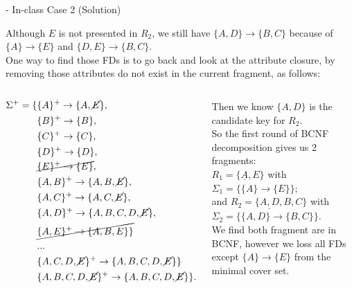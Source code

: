 \begin{frame}[fragile]{ - In-class Case 2 (Solution)}
	
	Although $E$ is not presented in $R_2$, we still have $\{A,D\}\rightarrow\{B,C\}$ because of $\{A\}\rightarrow\{E\}$ and $\{D,E\}\rightarrow\{B,C\}$.\\
	One way to find those FDs is to go back and look at the attribute closure, by removing those attributes do not exist in the current fragment, as follows:
	\vspace{-4pt}
	\begin{columns}
	\begin{scriptsize}\begin{align*} 
			\Sigma^{+} = \{&\{A\}^{+} \rightarrow \{A,\cancel{E}\},\\
			&\{B\}^{+} \rightarrow \{B\},\\
			&\{C\}^{+} \rightarrow \{C\},\\
			&\{D\}^{+} \rightarrow \{D\},\\
			&\cancel{\{E\}^{+} \rightarrow \{E\}},\\
			&\{A,B\}^{+} \rightarrow \{A,B,\cancel{E}\},\\
			&\{A,C\}^{+} \rightarrow \{A,C,\cancel{E}\},\\
			&\{A,D\}^{+} \rightarrow \{A,B,C,D,\cancel{E}\},\\
			&\cancel{\{A,E\}^{+} \rightarrow \{A,B,E\}\}}\\
			& ...\\
			&\{A,C,D,\cancel{E}\}^{+} \rightarrow \{A,B,C,D,\cancel{E}\}\}\\
			&\{A,B,C,D,\cancel{E}\}^{+} \rightarrow \{A,B,C,D,\cancel{E}\}\}.
	\end{align*}\end{scriptsize} 
	Then we know $\{A,D\}$ is the candidate key for $R_2$.\\\vspace{3pt}
	So the first round of BCNF decomposition gives us 2 fragments:\\\vspace{3pt} $R_1=\{\underline{A},E\}$ with $\Sigma_1=\{\{A\}\rightarrow\{E\}\}$;\\ and $R_2=\{\underline{A,D},B,C\}$ with $\Sigma_2=\{\{A,D\}\rightarrow\{B,C\}\}$.\\\vspace{3pt}
	We find both fragment are in BCNF, however we loss all FDs except $\{A\}\rightarrow\{E\}$ from the minimal cover set.\\ \vspace{2pt}
	\end{columns}
	
		
\end{frame}

